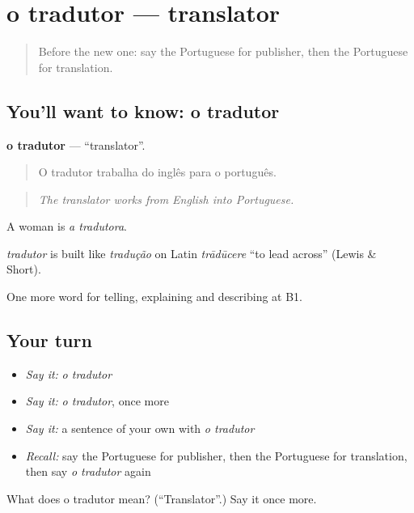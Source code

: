 \section[o tradutor]{o tradutor — translator}

\label{lesson:PT-C525-tradutor}



\begin{quote}
Before the new one: say the Portuguese for publisher, then the Portuguese for translation.
\end{quote}

\subsection*{You'll want to know: o tradutor}
\textbf{o tradutor} — \textquotedblleft{}translator\textquotedblright{}.

\begin{quote}
O tradutor trabalha do inglês para o português.
\end{quote}

\begin{quote}
\emph{The translator works from English into Portuguese.}
\end{quote}

A woman is \emph{a tradutora}.

\begin{cousinweb}
\emph{tradutor} is built like \emph{tradução} on Latin \emph{trādūcere} \textquotedblleft{}to lead across\textquotedblright{} (Lewis \& Short).
\end{cousinweb}

\begin{grammarlens}[title={What you've built}]
One more word for telling, explaining and describing at B1.
\end{grammarlens}

\subsection*{Your turn}
\begin{itemize}
\raggedright
  \item \emph{Say it:} \emph{o tradutor}
  \item \emph{Say it:} \emph{o tradutor}, once more
  \item \emph{Say it:} a sentence of your own with \emph{o tradutor}
  \item \emph{Recall:} say the Portuguese for publisher, then the Portuguese for translation, then say \emph{o tradutor} again
\end{itemize}

\begin{tcolorbox}[breakable,colback=teal!4,colframe=teal!35!black,title={Before you move on}]
What does o tradutor mean? (\textquotedblleft{}Translator\textquotedblright{}.) Say it once more.
\end{tcolorbox}
